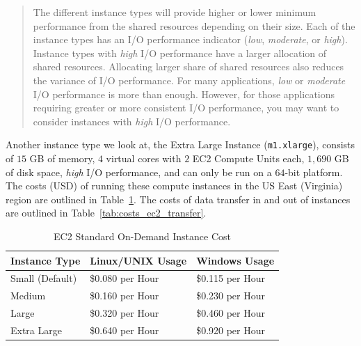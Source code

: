 \begin{quote}
  The different instance types will provide higher or lower minimum performance
  from the shared resources depending on their size. Each of the instance types
  has an I/O performance indicator (\emph{low}, \emph{moderate}, or
  \emph{high}). Instance types with \emph{high} I/O performance have a larger
  allocation of shared resources.  Allocating larger share of shared resources
  also reduces the variance of I/O performance. For many applications,
  \emph{low} or \emph{moderate} I/O performance is more than enough. However,
  for those applications requiring greater or more consistent I/O performance,
  you may want to consider instances with \emph{high} I/O performance.
\end{quote}

Another instance type we look at, the Extra Large Instance ({\tt m1.xlarge}),
consists of $15$ GB of memory, $4$ virtual cores with $2$ EC2 Compute Units
each, $1,690$ GB of disk space, \emph{high} I/O performance, and can only be
run on a $64$-bit platform. The costs (USD) of running these compute instances
in the US East (Virginia) region are outlined in
Table~\ref{tab:costs_ec2_instance}. The costs of data transfer in and out of
instances are outlined in Table~\ref{tab:costs_ec2_transfer}.

\begin{table}[htp]
  \begin{center}
    \begin{tabular}{|l|l l|}
      \hline
      \multicolumn{1}{|c}{\textbf{Instance Type}} &
      \multicolumn{1}{|c}{\textbf{Linux/UNIX Usage}} & 
      \multicolumn{1}{c|}{\textbf{Windows Usage}}\\
      \hline
          Small (Default) & \$0.080 per Hour & \$0.115 per Hour\\
                   Medium & \$0.160 per Hour & \$0.230 per Hour\\
                    Large & \$0.320 per Hour & \$0.460 per Hour\\
              Extra Large & \$0.640 per Hour & \$0.920 per Hour\\
      \hline
    \end{tabular}
    \caption{EC2 Standard On-Demand Instance Cost}
    \label{tab:costs_ec2_instance}
  \end{center}
\end{table}

